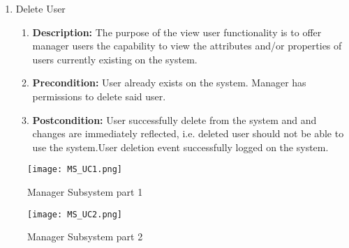 \documentclass{article}
\begin{document}
\begin{enumerate}
\begin{enumerate}
        \item Delete User
		\begin{enumerate}
			\item \textbf{Description:} The purpose of the view user functionality is to offer manager users the capability to view the attributes and/or properties of users currently existing on the system.
			\item \textbf{Precondition:} User already exists on the system. Manager has permissions to delete said user.

			\item \textbf{Postcondition:} User successfully delete from the system and and changes are immediately reflected, i.e. deleted user should not be able to use the system.User deletion event successfully logged on the system.
\newline
		\end{enumerate}
	\end{enumerate}
    
    \begin{figure}[H]
    	\texttt{[image: MS\_UC1.png]}
        \centering
		\caption{Manager Subsystem part 1}	
	\end{figure}
    
    \begin{figure}[H]
    	\texttt{[image: MS\_UC2.png]}
        \centering
		\caption{Manager Subsystem part 2}	
	\end{figure}
    
	\end{enumerate}
	
    \newpage 
\end{document}
